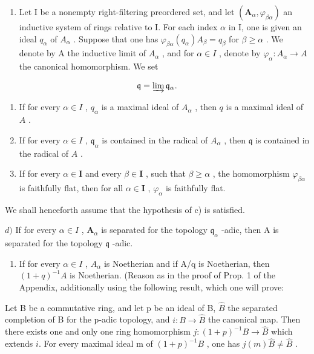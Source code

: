 \begin{enumerate}
\def\labelenumi{\arabic{enumi})}
\tightlist
\item
  Let I be a nonempty right-filtering preordered set, and let \((\mathbf{A}_{\alpha}, \varphi_{\beta\alpha})\) an inductive system of rings relative to I. For each index \(\alpha\) in I, one is given an ideal \(q_{\alpha}\) of \(A_{\alpha}\) . Suppose that one has \(\varphi_{\beta\alpha}(q_{\alpha}) A_{\beta} = q_{\beta}\) for \(\beta \geqslant \alpha\) . We denote by A the inductive limit of \(A_{\alpha}\) , and for \(\alpha \in I\) , denote by \(\varphi_{\alpha}: A_{\alpha} \to A\) the canonical homomorphism. We set
\end{enumerate}

\[
\mathfrak {q} = \varinjlim \mathfrak {q} _ {\alpha}.
\]

\begin{enumerate}
\def\labelenumi{\alph{enumi})}
\item
  If for every \(\alpha \in I\) , \(q_{\alpha}\) is a maximal ideal of \(A_{\alpha}\) , then \(q\) is a maximal ideal of \(A\) .
\item
  If for every \(\alpha \in I\) , \(\mathfrak{q}_{\alpha}\) is contained in the radical of \(A_{\alpha}\) , then \(\mathfrak{q}\) is contained in the radical of \(A\) .
\item
  If for every \(\alpha\in\mathbf{I}\) and every \(\beta\in\mathbf{I}\) , such that \(\beta\geqslant\alpha\) , the homomorphism \(\varphi_{\beta\alpha}\) is faithfully flat, then for all \(\alpha\in\mathbf{I}\) , \(\varphi_{\alpha}\) is faithfully flat.
\end{enumerate}

We shall henceforth assume that the hypothesis of c) is satisfied.

\(d)\) If for every \(\alpha\in I\) , \(\mathbf{A}_{\alpha}\) is separated for the topology \(\mathfrak{q}_{\alpha}\) -adic, then A is separated for the topology \(\mathfrak{q}\) -adic.

\begin{enumerate}
\def\labelenumi{\alph{enumi})}
\setcounter{enumi}{4}
\tightlist
\item
  If for every \(\alpha \in I\) , \(A_{\alpha}\) is Noetherian and if A/q is Noetherian, then \((1 + q)^{-1}A\) is Noetherian. (Reason as in the proof of Prop. 1 of the Appendix, additionally using the following result, which one will prove:
\end{enumerate}

Let B be a commutative ring, and let p be an ideal of B, \(\widehat{B}\) the separated completion of B for the p-adic topology, and \(i: B \to \widehat{B}\) the canonical map. Then there exists one and only one ring homomorphism \(j: (1 + p)^{-1}B \to \widehat{B}\) which extends \(i\). For every maximal ideal m of \((1 + p)^{-1}B\) , one has \(j(m)\widehat{B} \neq \widehat{B}\) .

